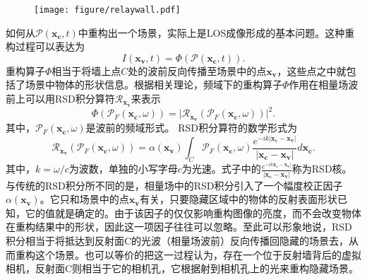 \documentclass[master]{shtthesis}             %
\begin{document}
\begin{figure}[!tb]
  \centering
  \texttt{[image: figure/relaywall.pdf]}
  \label{fig:rsd_nlos_scene}
\end{figure}

如何从$\mathcal{P}(\mathbf{x_c},t)$中重构出一个场景，实际上是LOS成像形成的基本问题。这种重构过程可以表达为
\begin{equation}\label{eq:recons}
  I(\mathbf{x_v}, t)=\varPhi (\mathcal{P}(\mathbf{x_c},t)).
\end{equation}
重构算子$\varPhi$相当于将墙上点$C$处的波前反向传播至场景中的点$\mathbf{x_v}$，这些点之中就包括了场景中物体的形状信息。根据相关理论\citep{Teichman2019}，频域下的重构算子$\varPhi$作用在相量场波前上可以用RSD积分算符$\mathcal{R}_{\mathbf{x_v}}$来表示
\begin{equation}\label{eq:recons_freq}
  \varPhi \left( \mathcal{P}_F(\mathbf{x_c},\omega) \right) = \Big| \mathcal{R}_{\mathbf{x_v}} \left( \mathcal{P}_F(\mathbf{x_c},\omega) \right) \Big|^2.
\end{equation}
其中，$\mathcal{P}_F(\mathbf{x_c},\omega)$是波前的频域形式。
RSD积分算符的数学形式为
\begin{equation}\label{eq:rsdint}
  \mathcal{R}_{\mathbf{x_v}} \left( \mathcal{P}_F(\mathbf{x_c},\omega) \right) = \alpha(\mathbf{x_v}) \int_C \mathcal{P}_F(\mathbf{x_c},\omega) \frac{e^{-ik|\mathbf{x_c}-\mathbf{x_v}|}}{|\mathbf{x_c}-\mathbf{x_v}|}d \mathbf{x_c} .
\end{equation}
其中，$k=\omega/c$为波数，单独的小写字母$c$为光速。式子中的$\frac{e^{-ik\mathbf{x_c}-\mathbf{x_v}|}}{|\mathbf{x_c}-\mathbf{x_v}|}$称为RSD核。与传统的RSD积分所不同的是，相量场中的RSD积分引入了一个幅度校正因子$\alpha(\mathbf{x_v})$。它只和场景中的点$\mathbf{x_v}$有关，只要隐藏区域中的物体的反射表面形状已知，它的值就是确定的。由于该因子的仅仅影响重构图像的亮度，而不会改变物体在重构结果中的形状，因此这一项因子往往可以忽略。至此可以形象地说，RSD积分相当于将抵达到反射面C的光波（相量场波前）反向传播回隐藏的场景去，从而重构这个场景。也可以等价的把这一过程认为，存在一个位于反射墙背后的虚拟相机，反射面C则相当于它的相机孔，它根据射到相机孔上的光来重构隐藏场景。
\end{document}
